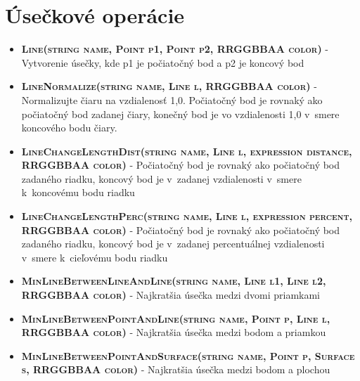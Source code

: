 \section*{Úsečkové operácie}
		
\begin{itemize}
\item \textsc{\textbf{Line(string name, Point p1, Point p2, RRGGBBAA color)}}  - Vytvorenie úsečky, kde p1 je počiatočný bod a p2 je koncový bod %

\item \textsc{\textbf{LineNormalize(string name, Line l, RRGGBBAA color)}} - Normalizujte čiaru na vzdialenosť 1,0. Počiatočný bod je rovnaký ako počiatočný bod zadanej čiary, konečný bod je vo vzdialenosti 1,0 v~smere koncového bodu čiary. %

\item \textsc{\textbf{LineChangeLengthDist(string name, Line l, expression distance, RRGGBBAA color)}} - Počiatočný bod je rovnaký ako počiatočný bod zadaného riadku, koncový bod je v~zadanej vzdialenosti v~smere k~koncovému bodu riadku%
		
\item \textsc{\textbf{LineChangeLengthPerc(string name, Line l, expression percent, RRGGBBAA color)}} - Počiatočný bod je rovnaký ako počiatočný bod zadaného riadku, koncový bod je v~zadanej percentuálnej vzdialenosti v~smere k~cieľovému bodu riadku %



		
\item \textsc{\textbf{MinLineBetweenLineAndLine(string name, Line l1, Line l2, RRGGBBAA color)}} - Najkratšia úsečka medzi dvomi priamkami%
		
\item \textsc{\textbf{MinLineBetweenPointAndLine(string name, Point p, Line l, RRGGBBAA color)}} - Najkratšia úsečka medzi bodom a priamkou
		
\item \textsc{\textbf{MinLineBetweenPointAndSurface(string name, Point p, Surface s, RRGGBBAA color)}} - Najkratšia úsečka medzi bodom a plochou%



\end{itemize}
